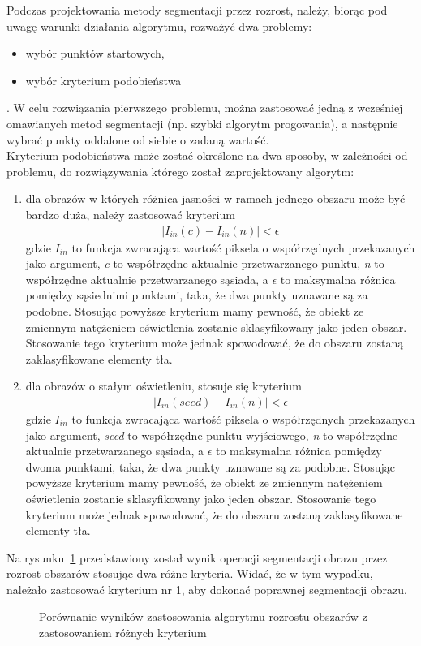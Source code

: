 Podczas projektowania metody segmentacji przez rozrost, należy, biorąc pod uwagę warunki działania algorytmu, rozważyć dwa problemy:
\begin{itemize}
  \item wybór punktów startowych,
  \item wybór kryterium podobieństwa
\end{itemize}.
W celu rozwiązania pierwszego problemu, można zastosować jedną z wcześniej omawianych metod segmentacji (np. szybki algorytm progowania), a następnie wybrać punkty oddalone od siebie o zadaną wartość. \\
Kryterium podobieństwa może zostać określone na dwa sposoby, w zależności od problemu, do rozwiązywania którego został zaprojektowany algorytm:
\begin{enumerate}
  \item dla obrazów w których różnica jasności w ramach jednego obszaru może być bardzo duża, należy zastosować kryterium 
    \begin{gather*}
      |I_{in}(c) - I_{in}(n)| < \epsilon
    \end{gather*}
    gdzie $I_{in}$ to funkcja zwracająca wartość piksela o współrzędnych przekazanych jako argument, \textit{c} to współrzędne aktualnie przetwarzanego punktu, \textit{n} to współrzędne aktualnie przetwarzanego sąsiada, a $\epsilon$ to maksymalna różnica pomiędzy sąsiednimi punktami, taka, że dwa punkty uznawane są za podobne. Stosując powyższe kryterium mamy pewność, że obiekt ze zmiennym natężeniem oświetlenia zostanie sklasyfikowany jako jeden obszar. Stosowanie tego kryterium może jednak spowodować, że do obszaru zostaną zaklasyfikowane elementy tła.
    \item dla obrazów o stałym oświetleniu, stosuje się kryterium
      \begin{gather*}
        |I_{in}(seed) - I_{in}(n)| < \epsilon
      \end{gather*}
      gdzie $I_{in}$ to funkcja zwracająca wartość piksela o współrzędnych przekazanych jako argument, \textit{seed} to współrzędne punktu wyjściowego, \textit{n} to współrzędne aktualnie przetwarzanego sąsiada, a $\epsilon$ to maksymalna różnica pomiędzy dwoma punktami, taka, że dwa punkty uznawane są za podobne. Stosując powyższe kryterium mamy pewność, że obiekt ze zmiennym natężeniem oświetlenia zostanie sklasyfikowany jako jeden obszar. Stosowanie tego kryterium może jednak spowodować, że do obszaru zostaną zaklasyfikowane elementy tła.
\end{enumerate}
Na rysunku~\ref{fig:region_growing} przedstawiony został wynik operacji segmentacji obrazu przez rozrost obszarów stosując dwa różne kryteria. Widać, że w tym wypadku, należało zastosować kryterium nr 1, aby dokonać poprawnej segmentacji obrazu.
\begin{figure}
  \centering
  \caption{Porównanie wyników zastosowania algorytmu rozrostu obszarów z zastosowaniem różnych kryterium}
  \label{fig:region_growing}
\end{figure}

